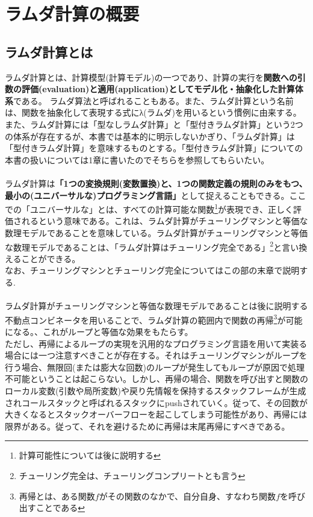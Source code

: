 \chapter{ラムダ計算の概要}{
	\section{ラムダ計算とは}{
		ラムダ計算とは、計算模型(計算モデル)の一つであり、計算の実行を{\bf 関数への引数の評価(evaluation)と適用(application)としてモデル化・抽象化した計算体系}である。
		ラムダ算法と呼ばれることもある。また、ラムダ計算という名前は、関数を抽象化して表現する式にλ(ラムダ)を用いるという慣例に由来する。
		また、ラムダ計算には「型なしラムダ計算」と「型付きラムダ計算」という2つの体系が存在するが、本書では基本的に明示しないかぎり、「ラムダ計算」は「型付きラムダ計算」を意味するものとする。「型付きラムダ計算」についての本書の扱いについては1章に書いたのでそちらを参照してもらいたい。\\
		\\
		ラムダ計算は{\bf 「1つの変換規則(変数置換)と、1つの関数定義の規則のみをもつ、最小の(ユニバーサルな)プログラミング言語」}として捉えることもできる。ここでの「ユニバーサルな」とは、すべての計算可能な関数\footnote{計算可能性については後に説明する}が表現でき、正しく評価されるという意味である。これは、ラムダ計算がチューリングマシンと等価な数理モデルであることを意味している。ラムダ計算がチューリングマシンと等価な数理モデルであることは、「ラムダ計算はチューリング完全である」\footnote{チューリング完全は、チューリングコンプリートとも言う}と言い換えることができる。\\
		なお、チューリングマシンとチューリング完全についてはこの部の末章で説明する. \\
		\\
		ラムダ計算がチューリングマシンと等価な数理モデルであることは後に説明する不動点コンビネータを用いることで、ラムダ計算の範囲内で関数の再帰\footnote{再帰とは、ある関数$f$がその関数のなかで、自分自身、すなわち関数$f$を呼び出すことである}が可能になる。、これがループと等価な効果をもたらす。\\
		ただし、再帰によるループの実現を汎用的なプログラミング言語を用いて実装る場合には一つ注意すべきことが存在する。それはチューリングマシンがループを行う場合、無限回(または膨大な回数)のループが発生してもループが原因で処理不可能ということは起こらない。しかし、再帰の場合、関数を呼び出すと関数のローカル変数(引数や局所変数)や戻り先情報を保持するスタックフレームが生成されコールスタックと呼ばれるスタックにpushされていく。従って、その回数が大きくなるとスタックオーバーフローを起こしてしまう可能性があり、再帰には限界がある。従って、それを避けるために再帰は末尾再帰にすべきである。
	}
}

